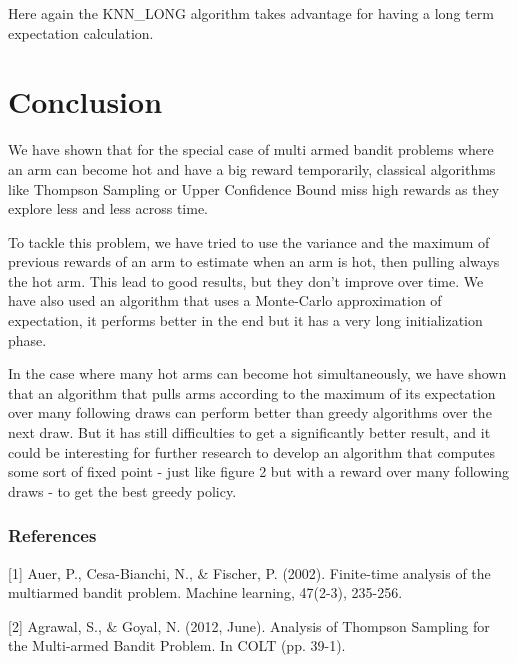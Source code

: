 \documentclass{article} %
\begin{document}
Here again the KNN\_LONG algorithm takes advantage for having a long term expectation calculation.

\clearpage
\section{Conclusion}

We have shown that for the special case of multi armed bandit problems where an arm can become hot and have a big reward temporarily, classical algorithms like Thompson Sampling or Upper Confidence Bound miss high rewards as they explore less and less across time.

To tackle this problem, we have tried to use the variance and the maximum of previous rewards of an arm to estimate when an arm is hot, then pulling always the hot arm. This lead to good results, but they don't improve over time. We have also used an algorithm that uses a Monte-Carlo approximation of expectation, it performs better in the end but it has a very long initialization phase.

In the case where many hot arms can become hot simultaneously, we have shown that an algorithm that pulls arms according to the maximum of its expectation over many following draws can perform better than greedy algorithms over the next draw. But it has still difficulties to get a significantly better result, and it could be interesting for further research to develop an algorithm that computes some sort of fixed point - just like figure 2 but with a reward over many following draws - to get the best greedy policy.


\subsubsection*{References}


\small{
[1] Auer, P., Cesa-Bianchi, N., \& Fischer, P. (2002). Finite-time analysis of the multiarmed bandit problem. Machine learning, 47(2-3), 235-256.

[2] Agrawal, S., \& Goyal, N. (2012, June). Analysis of Thompson Sampling for the Multi-armed Bandit Problem. In COLT (pp. 39-1).
}
\end{document}

